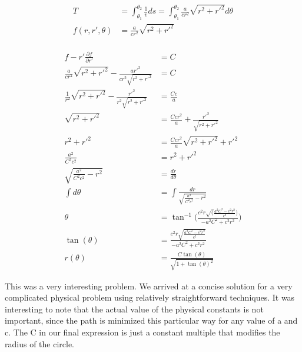 \documentclass[10pt]{article} %
\begin{document}
\begin{align*}
  T &= \int_{\theta_1}^{\theta_2} \frac{1}{v}ds = \int_{\theta_1}^{\theta_2} \frac{a}{cr^2}\sqrt{r^2+r'^2}d\theta\\
  f(r,r',\theta) &= \frac{a}{cr^2}\sqrt{r^2+r'^2}\\
\end{align*}

\begin{align*}
  f - r'\frac{\partial f}{\partial r'} &= C\\
  \frac{a}{cr^2}\sqrt{r^2+r'^2} - \frac{ar'^2}{cr^2\sqrt{r^2+r'^2}} &= C\\
  \frac{1}{r^2}\sqrt{r^2+r'^2} - \frac{r'^2}{r^2\sqrt{r^2+r'^2}} &= \frac{Cc}{a}\\
  \sqrt{r^2+r'^2} &= \frac{Ccr^2}{a} + \frac{r'^2}{\sqrt{r^2+r'^2}}\\
  r^2+r'^2 &= \frac{Ccr^2}{a}\sqrt{r^2+r'^2} + r'^2\\
  \frac{a^2}{C^2c^2} &= r^2+r'^2\\
  \sqrt{\frac{a^2}{C^2c^2} - r^2} &= \frac{dr}{d\theta}\\
  \int d\theta &= \int \frac{dr}{\sqrt{\frac{a^2}{C^2c^2} - r^2}}\\
  \theta &= \tan^{-1}\Big( \frac{c^2r\sqrt(\frac{a^2C^2-c^2r^2}{c^2})}{-a^2C^2+c^2r^2}   \Big)\\
  \tan(\theta) &= \frac{c^2r\sqrt{\frac{a^2C^2-c^2r^2}{c^2}}}{-a^2C^2+c^2r^2}\\
  r(\theta) &= \frac{C\tan(\theta)}{\sqrt{1+\tan(\theta)^2}}
\end{align*}


This was a very interesting problem. We arrived at a concise solution for a very complicated physical problem using relatively straightforward techniques. It was interesting to note that the actual value of the physical constants is not important, since the path is minimized this particular way for any value of a and c. The C in our final expression is just a constant multiple that modifies the radius of the circle.
\end{document}

